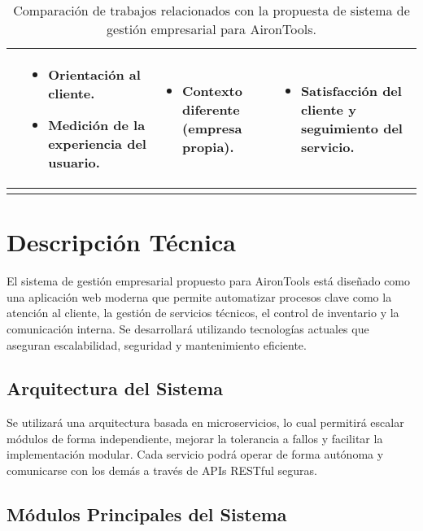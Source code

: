\begin{longtable}{|p{}|p{}|p{}|p{}|}
	\cite{Patino2019}                                                 &
	\begin{itemize}
		\item Orientación al cliente.
		\item Medición de la experiencia del usuario.
	\end{itemize}                     &
	\begin{itemize}
		\item Contexto diferente (empresa propia).
	\end{itemize}                        &
	\begin{itemize}
		\item Satisfacción del cliente y seguimiento del servicio.
	\end{itemize}                                                                                           \\
	\hline
	\caption{Comparación de trabajos relacionados con la propuesta de sistema de gestión empresarial para AironTools.}
	\label{tabla:trabajosRelacionados}
\end{longtable}

\section{Descripción Técnica}

El sistema de gestión empresarial propuesto para AironTools está diseñado como una aplicación web moderna que permite automatizar procesos clave como la atención al cliente, la gestión de servicios técnicos, el control de inventario y la comunicación interna. Se desarrollará utilizando tecnologías actuales que aseguran escalabilidad, seguridad y mantenimiento eficiente.

\subsection{Arquitectura del Sistema}

Se utilizará una arquitectura basada en microservicios, lo cual permitirá escalar módulos de forma independiente, mejorar la tolerancia a fallos y facilitar la implementación modular. Cada servicio podrá operar de forma autónoma y comunicarse con los demás a través de APIs RESTful seguras.

\subsection{Módulos Principales del Sistema}

